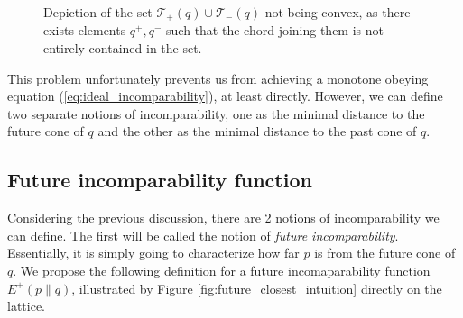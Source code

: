 \begin{figure}[h!]
    \centering
    \caption{Depiction of the set $\mathcal{T}_+(q) \cup \mathcal{T}_-(q)$ not being convex, as there exists elements $q^+, q^-$ such that the chord joining them is not entirely contained in the set.}
    \label{fig:convex_mixture_incomp}
\end{figure}

This problem unfortunately prevents us from achieving a monotone obeying equation (\ref{eq:ideal_incomparability}), at least directly. However, we can define two separate notions of incomparability, one as the minimal distance to the future cone of $q$ and the other as the minimal distance to the past cone of $q$.

\subsection{Future incomparability function}

Considering the previous discussion, there are 2 notions of incomparability we can define. The first will be called the notion of \textit{future incomparability}. Essentially, it is simply going to characterize how far $p$ is from the future cone of $q$. We propose the following definition for a future incomaparability function $E^+(p \parallel q)$, illustrated by Figure \ref{fig:future_closest_intuition} directly on the lattice.

